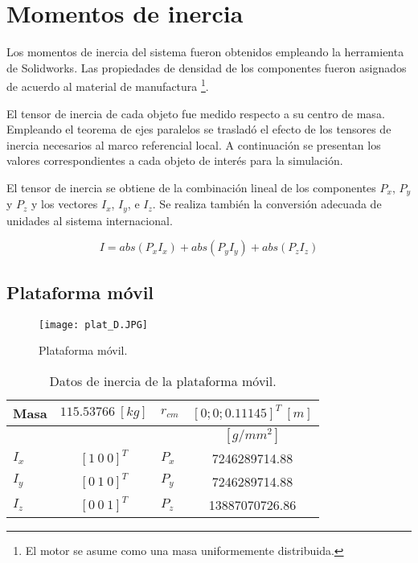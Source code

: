 \section{Momentos de inercia}
\label{sec: inertia}

Los momentos de inercia del sistema fueron obtenidos
empleando la herramienta de Solidworks. 
Las propiedades de densidad de los componentes 
fueron asignados de acuerdo al material de manufactura
\footnote{El motor se asume como una masa uniformemente distribuida.}.

El tensor de inercia de cada objeto fue medido respecto a su centro de masa.
Empleando el teorema de ejes paralelos 
\cite{olguin20183d}
se trasladó el efecto de los tensores de inercia necesarios al marco referencial local.
A continuación se presentan los valores correspondientes a cada objeto de interés para la simulación.

El tensor de inercia se obtiene de la combinación lineal 
de los componentes $P_x$, $P_y$ y $P_z$ y los vectores $ I_x$, $ I_y$, e $ I_z$.
Se realiza también la conversión adecuada de unidades al
sistema internacional.

\begin{equation*}
 I = abs(P_x  I_x) + abs(P_y I_y) +abs(P_z I_z)
\end{equation*}

\subsection{Plataforma móvil}

\begin{figure}[htb!]
    \centering
    \texttt{[image: plat\_D.JPG]}
    \caption{Plataforma móvil.}
    \label{fig: cad platform}
\end{figure}

\begin{table}[hb!]
 \begin{center}
\begin{tabular}{lclc}
 Masa & $  115.53766 \ [kg]$ & $r_{cm}$ &  $[0; 0; 0.11145]^T \ [m]$ \\
 \hline
 & & & $[g/mm^2]$\\
 \hline
 $ I_x $ & $ [1 \ 0 \ 0]^T $ & $ P_x $ & 7246289714.88\\
 $ I_y $ & $ [0 \ 1 \ 0]^T $ & $ P_y $ & 7246289714.88\\
 $ I_z $ & $ [0 \ 0 \ 1]^T $ & $ P_z $ & 13887070726.86
\end{tabular}
\end{center}
\caption{Datos de inercia de la plataforma móvil.}
\label{tab: inertia table platform}
\end{table}


